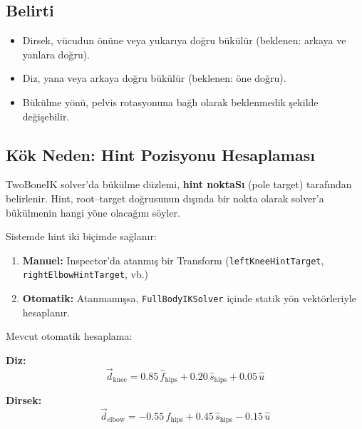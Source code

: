 \documentclass[11pt,a4paper]{article}
\begin{document}
\subsection{Belirti}

\begin{itemize}[nosep]
    \item Dirsek, v\"ucudun \"on\"une veya yukar{\i}ya do\u{g}ru b\"uk\"ul\"ur
          (beklenen: arkaya ve yanlara do\u{g}ru).
    \item Diz, yana veya arkaya do\u{g}ru b\"uk\"ul\"ur
          (beklenen: \"one do\u{g}ru).
    \item B\"uk\"ulme y\"on\"u, pelvis rotasyonuna ba\u{g}l{\i} olarak
          beklenmedik \c{s}ekilde de\u{g}i\c{s}ebilir.
\end{itemize}

\subsection{K\"ok Neden: Hint Pozisyonu Hesaplamas{\i}}
\label{sec:hint_kok}

TwoBoneIK solver'da b\"uk\"ulme d\"uzlemi, \textbf{hint noktaS{\i}}
(pole target) taraf{\i}ndan belirlenir. Hint, root--target
do\u{g}rusunun d{\i}\c{s}{\i}nda bir nokta olarak solver'a b\"uk\"ulmenin hangi
y\"one olaca\u{g}{\i}n{\i} s\"oyler.

Sistemde hint iki bi\c{c}imde sa\u{g}lan{\i}r:
\begin{enumerate}[nosep]
    \item \textbf{Manuel:} Inspector'da atanm{\i}\c{s} bir Transform
          (\texttt{leftKneeHintTarget}, \texttt{rightElbowHintTarget}, vb.)
    \item \textbf{Otomatik:} Atanmam{\i}\c{s}sa, \texttt{FullBodyIKSolver}
          i\c{c}inde statik y\"on vekt\"orleriyle hesaplan{\i}r.
\end{enumerate}

Mevcut otomatik hesaplama:

\textbf{Diz:}
\begin{equation}
    \vec{d}_{\text{knee}} = 0.85\,\hat{f}_{\text{hips}} + 0.20\,\hat{s}_{\text{hips}} + 0.05\,\hat{u}
    \label{eq:knee_hint}
\end{equation}

\textbf{Dirsek:}
\begin{equation}
    \vec{d}_{\text{elbow}} = -0.55\,\hat{f}_{\text{hips}} + 0.45\,\hat{s}_{\text{hips}} - 0.15\,\hat{u}
    \label{eq:elbow_hint}
\end{equation}
\end{document}
